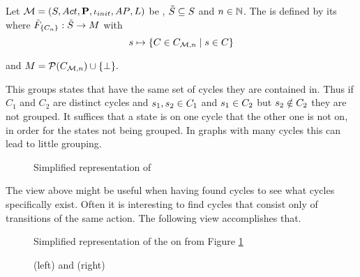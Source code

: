 \documentclass[preview]{standalone}
\begin{document}

\begin{definition}
	Let ${{{\mathcal{M}}}} = {{({S}, {Act}, {\textbf{P}}, {\iota_{init}}, {AP}, {L})}}$ be \achgphN, ${\tilde{{S}}} \subseteq {S}$ and $n \in {\mathbb{N}}$. The \viewN \viewexactcycle is defined by its \grpfctN where ${{\tilde{F}_{{\{{C}_n\}}}}} : {\tilde{{S}}} \to {\ensuremath{{M}}}$ with
	\[
	\state \mapsto \{\cycle \in \cycleset \mid \state \in \cycle\}
	\]
	
	and ${{M}} = {\mathcal{P}({{C}_{{{\mathcal{M}}}, n}})}\cup {\{\bot\}}.$
	\label{def:exactcycleview}
\end{definition}

This \viewN groups states that have the same set of cycles they are contained in. Thus if $C_1$ and $C_2$ are distinct cycles and ${s}_1, {s}_2 \in {C}_1$ and ${s}_1 \in {C}_2$ but ${s}_2 \notin {C}_2$ they are not grouped. It suffices that a state is on one cycle that the other one is not on, in order for the states not being grouped. In graphs with many cycles this can lead to little grouping.


\begin{figure}[h]
	\centering
				
	\caption{Simplified representation of \mdp}
	\label{fig:cyclesBefore}  
\end{figure}





The view above might be useful when having found cycles to see what cycles specifically exist. Often it is interesting to find cycles that consist only of transitions of the same action. The following view accomplishes that.

\begin{figure}[h]
	\centering
	
	\caption{Simplified representation of the \viewN \viewhascycle on \mdp from Figure \ref{fig:cyclesBefore}}
	\label{fig:cycleAfterHas}  
\end{figure}

\begin{figure}[h]
	\begin{minipage}{.5\textwidth}
		
	\end{minipage}%
	\begin{minipage}{.5\textwidth}
		
	\end{minipage}
	\caption{\viewNC \viewexactactcycle[0] (left) and \viewN \viewexactactcycle[5] (right)}
	\label{fig:cycleAfterExtact0}  
\end{figure}
\end{document}
